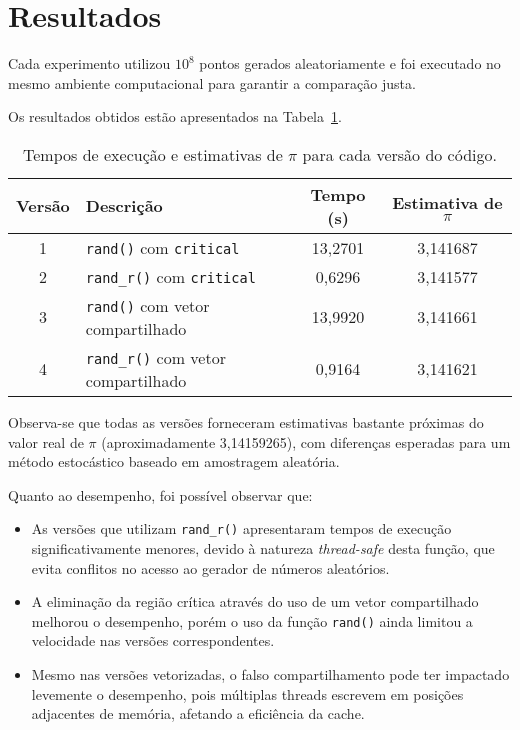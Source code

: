 \documentclass[a4paper, 12pt]{article}
\begin{document}
	\section{Resultados}
	
	Cada experimento utilizou $10^8$ pontos gerados aleatoriamente e foi executado no mesmo ambiente computacional para garantir a comparação justa.
	
	Os resultados obtidos estão apresentados na Tabela~\ref{tab:resultados}.
	
	\begin{table}[H]
		\centering
		\begin{tabular}{|c|l|c|c|}
			\hline
			\textbf{Versão} & \textbf{Descrição} & \textbf{Tempo (s)} & \textbf{Estimativa de $\pi$} \\
			\hline
			1 & \texttt{rand()} com \texttt{critical} & 13,2701 & 3,141687 \\
			\hline
			2 & \texttt{rand\_r()} com \texttt{critical} & 0,6296 & 3,141577 \\
			\hline
			3 & \texttt{rand()} com vetor compartilhado & 13,9920 & 3,141661 \\
			\hline
			4 & \texttt{rand\_r()} com vetor compartilhado & 0,9164 & 3,141621 \\
			\hline
		\end{tabular}
		\caption{Tempos de execução e estimativas de $\pi$ para cada versão do código.}
		\label{tab:resultados}
	\end{table}
	
	Observa-se que todas as versões forneceram estimativas bastante próximas do valor real de $\pi$ (aproximadamente 3,14159265), com diferenças esperadas para um método estocástico baseado em amostragem aleatória.
	
	Quanto ao desempenho, foi possível observar que:
	
	\begin{itemize}
		\item As versões que utilizam \texttt{rand\_r()} apresentaram tempos de execução significativamente menores, devido à natureza \textit{thread-safe} desta função, que evita conflitos no acesso ao gerador de números aleatórios.
		\item A eliminação da região crítica através do uso de um vetor compartilhado melhorou o desempenho, porém o uso da função \texttt{rand()} ainda limitou a velocidade nas versões correspondentes.
		\item Mesmo nas versões vetorizadas, o falso compartilhamento pode ter impactado levemente o desempenho, pois múltiplas threads escrevem em posições adjacentes de memória, afetando a eficiência da cache.
	\end{itemize}
	
\end{document}

